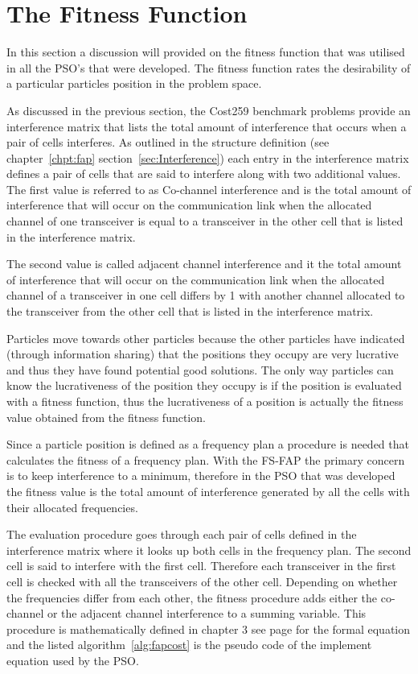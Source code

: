\section{The Fitness Function}
In this section a discussion will provided on the fitness function that was utilised in all the PSO's that were developed. The fitness function rates the desirability of a particular particles position in the problem space.

As discussed in the previous section, the Cost259 benchmark problems provide an interference matrix that lists the total amount of interference that occurs when a pair of cells interferes. As outlined in the structure definition (see chapter~\ref{chpt:fap} section~\ref{sec:Interference}) each entry in the interference matrix defines a pair of cells that are said to interfere along with two additional values. The first value is referred to as Co-channel interference and is the total amount of interference that will occur on the communication link when the allocated channel of one transceiver is equal to a transceiver in the other cell that is listed in the interference matrix. 

The second value is called adjacent channel interference and it the total amount of interference that will occur on the communication link when the allocated channel of a transceiver in one cell differs by 1 with another channel allocated to the transceiver from the other cell that is listed in the interference matrix.

Particles move towards other particles because the other particles have indicated (through information sharing) that the positions they occupy are very lucrative and thus they have found potential good solutions. The only way particles can know the lucrativeness of the position they occupy is if the position is evaluated with a fitness function, thus the lucrativeness of a position is actually the fitness value obtained from the fitness function. 

Since a particle position is defined as a frequency plan a procedure is needed that calculates the fitness of a frequency plan. With the FS-FAP the primary concern is to keep interference to a minimum, therefore in the PSO that was developed the fitness value is the total amount of interference generated by all the cells with their allocated frequencies. 

The evaluation procedure goes through each pair of cells defined in the interference matrix where it looks up both cells in the frequency plan. The second cell is said to interfere with the first cell. Therefore each transceiver in the first cell is checked with all the transceivers of the other cell. Depending on whether the frequencies differ from each other, the fitness procedure adds either the co-channel or the adjacent channel interference to a summing variable. This procedure is mathematically defined in chapter 3 see page \pageref{E:costFunction} for the formal equation and the listed algorithm~\ref{alg:fapcost} is the pseudo code of the implement equation used by the PSO. 

